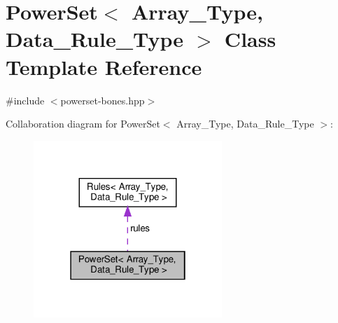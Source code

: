 \hypertarget{class_power_set}{}\section{Power\+Set$<$ Array\+\_\+\+Type, Data\+\_\+\+Rule\+\_\+\+Type $>$ Class Template Reference}
\label{class_power_set}


{\ttfamily \#include $<$powerset-\/bones.\+hpp$>$}



Collaboration diagram for Power\+Set$<$ Array\+\_\+\+Type, Data\+\_\+\+Rule\+\_\+\+Type $>$\+:\nopagebreak
\begin{figure}[H]
\begin{center}
\leavevmode
\includegraphics[width=202pt]{class_power_set__coll__graph}
\end{center}
\end{figure}
